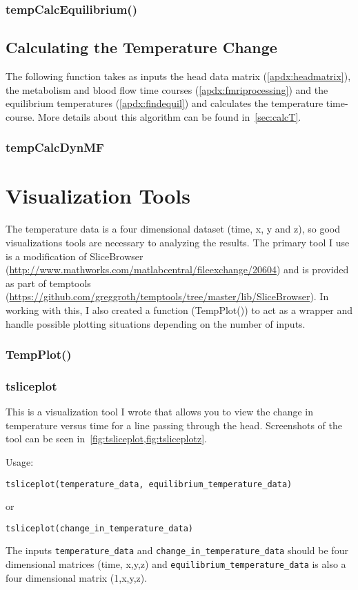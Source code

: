 \subsection{tempCalcEquilibrium()}

\clearpage
\section{Calculating the Temperature Change}
The following function takes as inputs the head data matrix (\cref{apdx:headmatrix}), the metabolism and blood flow time courses (\cref{apdx:fmriprocessing}) and the equilibrium temperatures (\cref{apdx:findequil}) and calculates the temperature time-course.   More details about this algorithm can be found in~\cref{sec:calcT}.
\subsection{tempCalcDynMF}
\label{apdx:tempCalcDynMF}

\chapter{Visualization Tools}
\label{apdx:visualize}
The temperature data is a four dimensional dataset (time, x, y and z), so good visualizations tools are necessary to analyzing the results.  The primary tool I use is a modification of SliceBrowser (\url{http://www.mathworks.com/matlabcentral/fileexchange/20604}) and is provided as part of temptools (\url{https://github.com/greggroth/temptools/tree/master/lib/SliceBrowser}).  In working with this, I also created a function (TempPlot()) to act as a wrapper and handle possible plotting situations depending on the number of inputs.
\setcounter{section}{1}
\setcounter{subsection}{0}
\subsection{TempPlot()}

\subsection{tsliceplot}
This is a visualization tool I wrote that allows you to view the change in temperature versus time for a line passing through the head.  Screenshots of the tool can be seen in~\cref{fig:tsliceplot,fig:tsliceplotz}.

Usage:
\begin{lstlisting}[style=snippet,label=invoke-tsliceplot]
  tsliceplot(temperature_data, equilibrium_temperature_data)
\end{lstlisting}
or
\begin{lstlisting}[style=snippet]
  tsliceplot(change_in_temperature_data)
\end{lstlisting}
The inputs {\tt temperature\_data} and {\tt change\_in\_temperature\_data} should be four dimensional matrices (time, x,y,z) and {\tt equilibrium\_temperature\_data} is also a four dimensional matrix (1,x,y,z).


